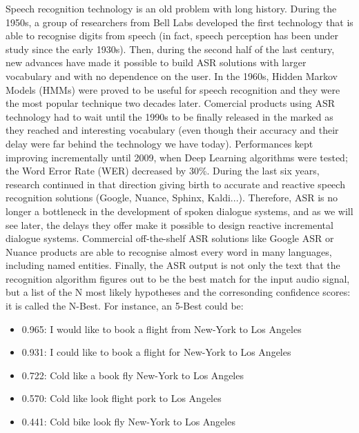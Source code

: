 		Speech recognition technology is an old problem with long history. During the 1950s, a group of researchers from Bell Labs developed the first technology that is able to recognise digits from speech (in fact, speech perception has been under study since the early 1930s). Then, during the second half of the last century, new advances have made it possible to build ASR solutions with larger vocabulary and with no dependence on the user. In the 1960s, Hidden Markov Models (HMMs) were proved to be useful for speech recognition and they were the most popular technique two decades later. Comercial products using ASR technology had to wait until the 1990s to be finally released in the marked as they reached and interesting vocabulary (even though their accuracy and their delay were far behind the technology we have today). Performances kept improving incrementally until 2009, when Deep Learning algorithms were tested; the Word Error Rate (WER) decreased by 30\%. During the last six years, research continued in that direction giving birth to accurate and reactive speech recognition solutions (Google, Nuance, Sphinx, Kaldi...). Therefore, ASR is no longer a bottleneck in the development of spoken dialogue systems, and as we will see later, the delays they offer make it possible to design reactive incremental dialogue systems. Commercial off-the-shelf ASR solutions like Google ASR or Nuance products are able to recognise almost every word in many languages, including named entities. Finally, the ASR output is not only the text that the recognition algorithm figures out to be the best match for the input audio signal, but a list of the N most likely hypotheses and the corresonding confidence scores: it is called the N-Best. For instance, an 5-Best could be:

		\begin{itemize}
			\item 0.965: I would like to book a flight from New-York to Los Angeles
			\item 0.931: I could like to book a flight for New-York to Los Angeles
			\item 0.722: Cold like a book fly New-York to Los Angeles
			\item 0.570: Cold like look flight pork to Los Angeles
			\item 0.441: Cold bike look fly New-York to Los Angeles  
		\end{itemize}

